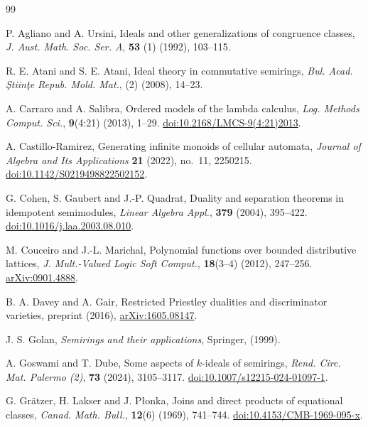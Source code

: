 \documentclass[12pt,english]{amsart}
\theoremstyle{definition}
\numberwithin{equation}{section}
\theoremstyle{remark}
\begin{document}
\endgroup

\begin{thebibliography}{99}
\raggedright
{}
P. Agliano and A. Ursini, Ideals and other generalizations of congruence classes, \textit{J. Aust. Math. Soc. Ser. A}, \textbf{53} (1) (1992),
103--115.

R. E. Atani and S. E. Atani, Ideal theory in commutative semirings, \textit{Bul. Acad. Ştiinţe Repub. Mold. Mat.}, (2) (2008), 14--23.

A. Carraro and A. Salibra, Ordered models of the lambda calculus,
\textit{Log. Methods Comput. Sci.}, \textbf{9}(4:21) (2013), 1--29.
\href{https://doi.org/10.2168/LMCS-9(4:21)2013}{doi:10.2168/LMCS-9(4:21)2013}.

A. Castillo-Ramirez, Generating infinite monoids of cellular
automata, \emph{Journal of Algebra and Its Applications}
\textbf{21} (2022), no.~11, 2250215.
\href{https://doi.org/10.1142/S0219498822502152}{doi:10.1142/S0219498822502152}.

G. Cohen, S. Gaubert and J.-P. Quadrat,
Duality and separation theorems in idempotent semimodules,
\textit{Linear Algebra Appl.}, \textbf{379} (2004), 395--422.
\href{https://doi.org/10.1016/j.laa.2003.08.010}{doi:10.1016/j.laa.2003.08.010}.

M. Couceiro and J.-L. Marichal, Polynomial functions over bounded
distributive lattices, \textit{J. Mult.-Valued Logic Soft Comput.},
\textbf{18}(3--4) (2012), 247--256.
\href{https://arxiv.org/abs/0901.4888}{arXiv:0901.4888}.

B. A. Davey and A. Gair, Restricted Priestley dualities and discriminator varieties,
preprint (2016), \href{https://arxiv.org/abs/1605.08147}{arXiv:1605.08147}.

J. S. Golan, \textit{Semirings and their applications}, Springer, (1999).

A. Goswami and T. Dube, Some aspects of $k$-ideals of semirings,
\textit{Rend. Circ. Mat. Palermo (2)}, \textbf{73} (2024), 3105--3117.
\href{https://doi.org/10.1007/s12215-024-01097-1}{doi:10.1007/s12215-024-01097-1}.

G. Gr\"atzer, H. Lakser and J. P\l onka, Joins and direct products of
equational classes, \textit{Canad. Math. Bull.}, \textbf{12}(6) (1969),
741--744.
\href{https://doi.org/10.4153/CMB-1969-095-x}{doi:10.4153/CMB-1969-095-x}.


\end{thebibliography}
\end{document}
